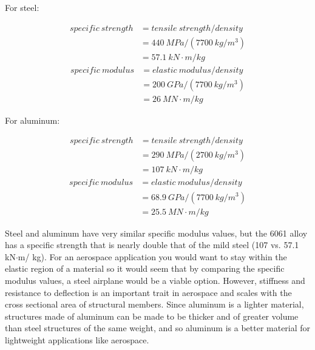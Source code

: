\documentclass{article}
\begin{document}
\begin{enumerate}
For steel:
\begin{center}
\begin{align*}
specific \:strength &= tensile\: strength / density \\
&= 440 \:\si{MPa} /( 7700\: \si{kg}/\si{m^3}) \\
&= 57.1 \:\si{kN}\cdot\si{m}/ \si{kg}
\end{align*}
\begin{align*}
specific \:modulus &= elastic\: modulus / density \\
&= 200 \:\si{GPa} / (7700\: \si{kg}/\si{m^3}) \\
&= 26 \:\si{MN}\cdot\si{m}/ \si{kg}
\end{align*}

\end{center}

For aluminum:
\begin{center}
\begin{align*}
specific \:strength &= tensile\: strength / density \\
&= 290 \:\si{MPa} / (2700\: \si{kg}/\si{m^3}) \\
&= 107 \:\si{kN}\cdot\si{m}/ \si{kg}
\end{align*}
\begin{align*}
specific \:modulus &= elastic\: modulus / density \\
&= 68.9 \:\si{GPa} / (7700\: \si{kg}/\si{m^3}) \\
&= 25.5 \:\si{MN}\cdot\si{m}/ \si{kg}
\end{align*}

\end{center}

Steel and aluminum have very similar specific modulus values, but the 6061 alloy has a specific strength that is nearly double that of the mild steel (107 vs. 57.1 \si{kN}$\cdot$\si{m}/ {kg}). For an aerospace application you would want to stay within the elastic region of a material so it would seem that by comparing the specific modulus values, a steel airplane would be a viable option. However, stiffness and resistance to deflection is an important trait in aerospace and scales with the cross sectional area of structural members. Since aluminum is a lighter material, structures made of aluminum can be made to be thicker and of greater volume than steel structures of the same weight, and so aluminum is a better material for lightweight applications like aerospace.
\end{enumerate}
\end{document}
